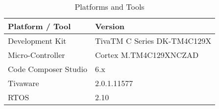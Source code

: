 \begin{table}[H]
	\begin{tabu} spread \linewidth {X[m] | X[m]}
		\textbf{Platform / Tool} & \textbf{Version} \\
		\hline \hline
		Development Kit & TivaTM C Series DK-TM4C129X\\
		\hline
		Micro-Controller & Cortex M.TM4C129XNCZAD\\
		\hline
		Code Composer Studio & 6.x\\
		\hline
		Tivaware & 2.0.1.11577\\
		\hline
		RTOS & 2.10\\
	\end{tabu}
	\caption{Platforms and Tools}
	\label{tab:PlatformsAndTools}
\end{table}